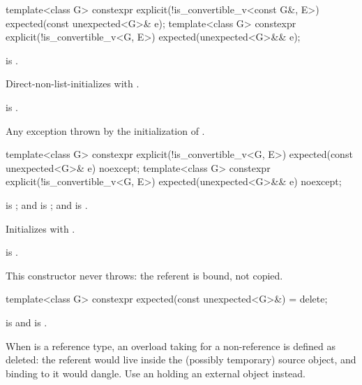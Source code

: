 %
\begin{itemdecl}
template<class G>
  constexpr explicit(!is_convertible_v<const G&, E>) expected(const unexpected<G>& e);
template<class G>
  constexpr explicit(!is_convertible_v<G, E>) expected(unexpected<G>&& e);
\end{itemdecl}

\begin{itemdescr}
\pnum
\constraints
{} is .

\pnum
\effects
Direct-non-list-initializes  with .

\pnum
\ensures
{} is .

\pnum
\throws
Any exception thrown by the initialization of .
\end{itemdescr}

%
\begin{itemdecl}
template<class G>
  constexpr explicit(!is_convertible_v<G, E>) expected(const unexpected<G>& e) noexcept;
template<class G>
  constexpr explicit(!is_convertible_v<G, E>) expected(unexpected<G>&& e) noexcept;
\end{itemdecl}

\begin{itemdescr}
\pnum
\constraints
{} is ; and  is ; and  is .

\pnum
\effects
Initializes  with .

\pnum
\ensures
{} is .

\pnum
\remarks
This constructor never throws: the referent is bound, not copied.
\end{itemdescr}

%
\begin{itemdecl}
template<class G>
  constexpr expected(const unexpected<G>&) = delete;
\end{itemdecl}

\begin{itemdescr}
\pnum
\constraints
{} is  and  is .

\pnum
\remarks
When  is a reference type, an overload taking  for a non-reference  is defined as deleted: the referent would live inside the (possibly temporary) source  object, and binding  to it would dangle. Use an  holding an external object instead.
\end{itemdescr}

